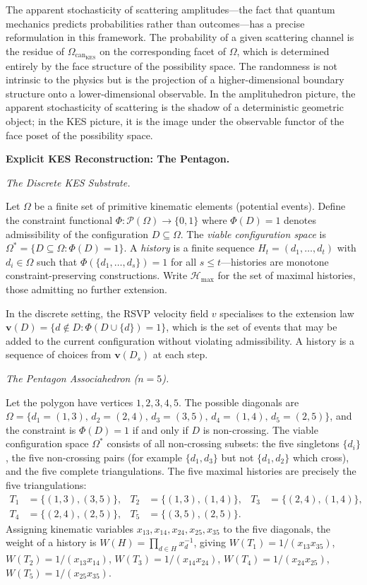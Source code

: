 \documentclass[12pt, oneside]{amsart}
\theoremstyle{plain}
\theoremstyle{definition}
\theoremstyle{remark}
\newcommand{\Phif}{\Phi}
\newcommand{\vf}{v}
\newcommand{\OmKS}{\Omega}
\newcommand{\CF}{\Omega_{\mathrm{can}}}
\newcommand{\Hmax}{\mathcal{H}_{\max}}
\begin{document}
The apparent stochasticity of scattering amplitudes---the fact that quantum mechanics predicts probabilities rather than outcomes---has a precise reformulation in this framework. The probability of a given scattering channel is the residue of $\CF_{\mathrm{KES}}$ on the corresponding facet of $\OmKS$, which is determined entirely by the face structure of the possibility space. The randomness is not intrinsic to the physics but is the projection of a higher-dimensional boundary structure onto a lower-dimensional observable. In the amplituhedron picture, the apparent stochasticity of scattering is the shadow of a deterministic geometric object; in the KES picture, it is the image under the observable functor of the face poset of the possibility space.

\bigskip\noindent\textbf{Explicit KES Reconstruction: The Pentagon.}
\label{sec:discrete}

\medskip\noindent\textit{The Discrete KES Substrate.}

Let $\OmKS$ be a finite set of primitive kinematic elements (potential events). Define the constraint functional $\Phif: \mathcal{P}(\OmKS) \to \{0,1\}$ where $\Phif(D) = 1$ denotes admissibility of the configuration $D \subseteq \OmKS$. The \emph{viable configuration space} is $\OmKS^* = \{D \subseteq \OmKS : \Phif(D) = 1\}$. A \emph{history} is a finite sequence $H_t = (d_1, \ldots, d_t)$ with $d_i \in \OmKS$ such that $\Phif(\{d_1, \ldots, d_s\}) = 1$ for all $s \leq t$---histories are monotone constraint-preserving constructions. Write $\Hmax$ for the set of maximal histories, those admitting no further extension.

In the discrete setting, the RSVP velocity field $\vf$ specialises to the extension law $\mathbf{v}(D) = \{d \notin D : \Phif(D \cup \{d\}) = 1\}$, which is the set of events that may be added to the current configuration without violating admissibility. A history is a sequence of choices from $\mathbf{v}(D_s)$ at each step.

\medskip\noindent\textit{The Pentagon Associahedron ($n = 5$).}

Let the polygon have vertices $1, 2, 3, 4, 5$. The possible diagonals are $\OmKS = \{d_1 = (1,3),\, d_2 = (2,4),\, d_3 = (3,5),\, d_4 = (1,4),\, d_5 = (2,5)\}$, and the constraint is $\Phif(D) = 1$ if and only if $D$ is non-crossing. The viable configuration space $\OmKS^*$ consists of all non-crossing subsets: the five singletons $\{d_i\}$, the five non-crossing pairs (for example $\{d_1, d_3\}$ but not $\{d_1, d_2\}$ which cross), and the five complete triangulations. The five maximal histories are precisely the five triangulations:
\begin{align*}
  T_1 &= \{(1,3),(3,5)\}, & T_2 &= \{(1,3),(1,4)\}, & T_3 &= \{(2,4),(1,4)\},\\
  T_4 &= \{(2,4),(2,5)\}, & T_5 &= \{(3,5),(2,5)\}.
\end{align*}
Assigning kinematic variables $x_{13}, x_{14}, x_{24}, x_{25}, x_{35}$ to the five diagonals, the weight of a history is $W(H) = \prod_{d \in H} x_d^{-1}$, giving $W(T_1) = 1/(x_{13}x_{35})$, $W(T_2) = 1/(x_{13}x_{14})$, $W(T_3) = 1/(x_{14}x_{24})$, $W(T_4) = 1/(x_{24}x_{25})$, $W(T_5) = 1/(x_{25}x_{35})$.
\end{document}
